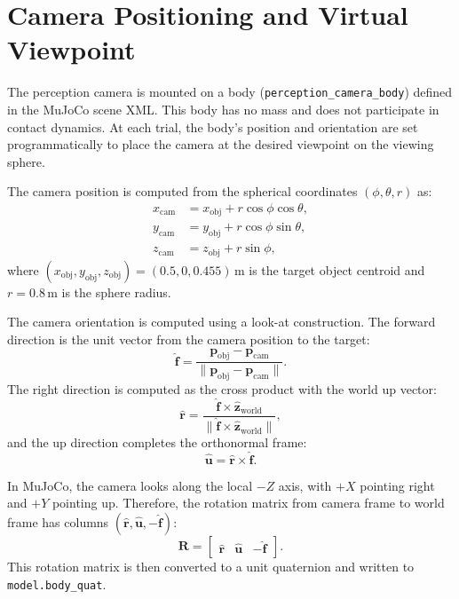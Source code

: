 \documentclass[11pt,a4paper]{report}
\begin{document}
\section{Camera Positioning and Virtual Viewpoint}
\label{sec:camera_positioning}

The perception camera is mounted on a body (\texttt{perception\_camera\_body}) defined in the MuJoCo scene XML. This body has no mass and does not participate in contact dynamics. At each trial, the body's position and orientation are set programmatically to place the camera at the desired viewpoint on the viewing sphere.

The camera position is computed from the spherical coordinates $(\phi, \theta, r)$ as:
\begin{align}
  x_{\text{cam}} &= x_{\text{obj}} + r \cos\phi \cos\theta, \nonumber \\
  y_{\text{cam}} &= y_{\text{obj}} + r \cos\phi \sin\theta, \label{eq:cam_pos} \\
  z_{\text{cam}} &= z_{\text{obj}} + r \sin\phi, \nonumber
\end{align}
where $(x_{\text{obj}}, y_{\text{obj}}, z_{\text{obj}}) = (0.5, 0, 0.455)$\,m is the target object centroid and $r = 0.8$\,m is the sphere radius.

The camera orientation is computed using a look-at construction. The forward direction is the unit vector from the camera position to the target:
\begin{equation}
  \hat{\mathbf{f}} = \frac{\mathbf{p}_{\text{obj}} - \mathbf{p}_{\text{cam}}}
                         {\|\mathbf{p}_{\text{obj}} - \mathbf{p}_{\text{cam}}\|}.
  \label{eq:forward}
\end{equation}
The right direction is computed as the cross product with the world up vector:
\begin{equation}
  \hat{\mathbf{r}} = \frac{\hat{\mathbf{f}} \times \hat{\mathbf{z}}_{\text{world}}}
                         {\|\hat{\mathbf{f}} \times \hat{\mathbf{z}}_{\text{world}}\|},
  \label{eq:right}
\end{equation}
and the up direction completes the orthonormal frame:
\begin{equation}
  \hat{\mathbf{u}} = \hat{\mathbf{r}} \times \hat{\mathbf{f}}.
  \label{eq:up}
\end{equation}

In MuJoCo, the camera looks along the local $-Z$ axis, with $+X$ pointing right and $+Y$ pointing up. Therefore, the rotation matrix from camera frame to world frame has columns $(\hat{\mathbf{r}}, \hat{\mathbf{u}}, -\hat{\mathbf{f}})$:
\begin{equation}
  \mathbf{R} = \begin{bmatrix} \hat{\mathbf{r}} & \hat{\mathbf{u}} & -\hat{\mathbf{f}} \end{bmatrix}.
  \label{eq:cam_rot}
\end{equation}
This rotation matrix is then converted to a unit quaternion and written to \texttt{model.body\_quat}.
\end{document}
